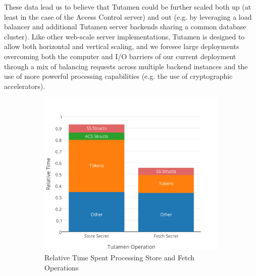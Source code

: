 These data lead us to believe that Tutamen could be further scaled
both up (at least in the case of the Access Control server) and out
(e.g. by leveraging a load balancer and additional Tutamen server
backends sharing a common database cluster). Like other web-scale
server implementations, Tutamen is designed to allow both horizontal
and vertical scaling, and we foresee large deployments overcoming both
the computer and I/O barriers of our current deployment through a mix
of balancing requests across multiple backend instances and the use of
more powerful processing capabilities (e.g. the use of cryptographic
accelerators).

\begin{figure}[th]
  \centering
  \begin{subfigure}[t]{0.48\textwidth}
    \includegraphics[width=\textwidth]{./figs/png/timing_bars_chart.png}
    \caption{Relative Time Spent Processing Store and Fetch
      Operations}
    \label{fig:eval:rel:secret}
  \end{subfigure}
  ~
  \begin{subfigure}[t]{0.48\textwidth}

\end{subfigure}
\end{figure}
